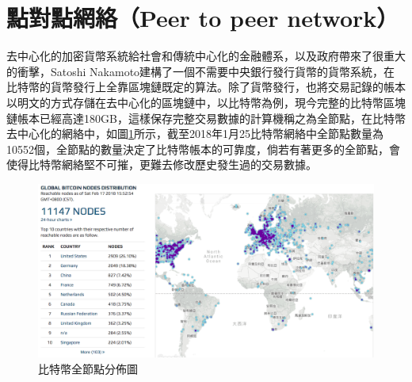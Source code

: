 
	\section{點對點網絡（Peer to peer network）}

	去中⼼化的加密貨幣系統給社會和傳統中⼼化的⾦融體系，以及政府帶來了很重⼤的衝擊，Satoshi Nakamoto建構了一個不需要中央銀行發行貨幣的貨幣系統，在比特幣的貨幣發行上全靠區塊鏈既定的算法。除了貨幣發行，也將交易記錄的帳本以明文的方式存儲在去中心化的區塊鏈中，以比特幣為例，現今完整的比特幣區塊鏈帳本已經高達180GB，這樣保存完整交易數據的計算機稱之為全節點，在比特幣去中心化的網絡中，如圖\ref{bitcoinfullnode}所示，截至2018年1月25比特幣網絡中全節點數量為10552個\supercite{bitcoinfullnode}，全節點的數量決定了比特幣帳本的可靠度，倘若有著更多的全節點，會使得比特幣網絡堅不可摧，更難去修改歷史發生過的交易數據。

	\begin{figure}
		\centering
		\includegraphics[width = .9\textwidth]{bitcoinfullnode.png}
		\caption{比特幣全節點分佈圖\supercite{bitcoinfullnode}}\label{bitcoinfullnode}
	\end{figure}

